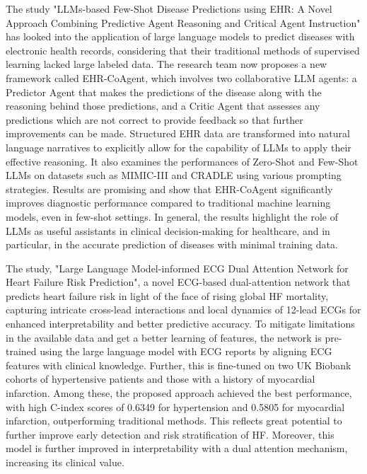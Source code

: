 The study  "LLMs-based Few-Shot Disease Predictions using EHR: A Novel Approach Combining Predictive Agent Reasoning and Critical Agent Instruction" has looked into the application of large language models to predict diseases with electronic health records, considering that their traditional methods of supervised learning lacked large labeled data. The research team now proposes a new framework called EHR-CoAgent, which involves two collaborative LLM agents: a Predictor Agent that makes the predictions of the disease along with the reasoning behind those predictions, and a Critic Agent that assesses any predictions which are not correct to provide feedback so that further improvements can be made. Structured EHR data are transformed into natural language narratives to explicitly allow for the capability of LLMs to apply their effective reasoning. It also examines the performances of Zero-Shot and Few-Shot LLMs on datasets such as MIMIC-III and CRADLE using various prompting strategies. Results are promising and show that EHR-CoAgent significantly improves diagnostic performance compared to traditional machine learning models, even in few-shot settings. In general, the results highlight the role of LLMs as useful assistants in clinical decision-making for healthcare, and in particular, in the accurate prediction of diseases with minimal training data.
\vspace{0.5cm}

The study\cite{chen2024largelanguagemodelinformedecg}, "Large Language Model-informed ECG Dual Attention Network for Heart Failure Risk Prediction", a novel ECG-based dual-attention network that predicts heart failure risk in light of the face of rising global HF mortality, capturing intricate cross-lead interactions and local dynamics of 12-lead ECGs for enhanced interpretability and better predictive accuracy. To mitigate limitations in the available data and get a better learning of features, the network is pre-trained using the large language model with ECG reports by aligning ECG features with clinical knowledge. Further, this is fine-tuned on two UK Biobank cohorts of hypertensive patients and those with a history of myocardial infarction. Among these, the proposed approach achieved the best performance, with high C-index scores of 0.6349 for hypertension and 0.5805 for myocardial infarction, outperforming traditional methods. This reflects great potential to further improve early detection and risk stratification of HF. Moreover, this model is further improved in interpretability with a dual attention mechanism, increasing its clinical value.
\vspace{0.5cm}

